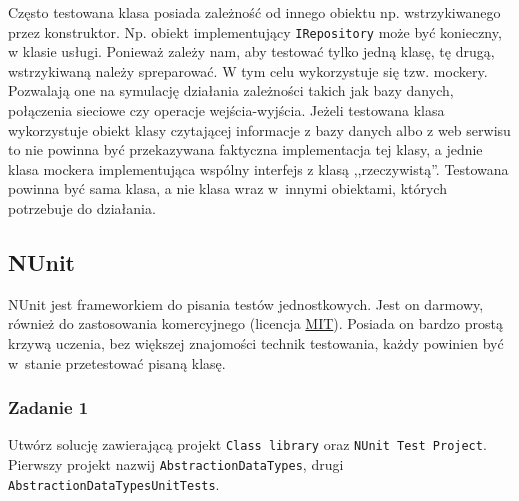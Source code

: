 
Często testowana klasa posiada zależność od innego obiektu np. wstrzykiwanego przez konstruktor. Np. obiekt implementujący \texttt{IRepository} może być konieczny, w klasie usługi. Ponieważ zależy nam, aby testować tylko jedną klasę, tę drugą, wstrzykiwaną należy spreparować. W tym celu wykorzystuje się tzw. mockery. Pozwalają one na symulację działania zależności takich jak bazy danych, połączenia sieciowe czy operacje wejścia-wyjścia. Jeżeli testowana klasa wykorzystuje obiekt klasy czytającej informacje z bazy danych albo z web serwisu to nie powinna być przekazywana faktyczna implementacja tej klasy, a jednie klasa mockera implementująca wspólny interfejs z klasą ,,rzeczywistą''. Testowana powinna być sama klasa, a nie klasa wraz w~innymi obiektami, których potrzebuje do działania. 


\subsection{NUnit}
NUnit jest frameworkiem do pisania testów jednostkowych. Jest on darmowy, również do zastosowania komercyjnego (licencja \href{https://mit-license.org/}{MIT}). Posiada on bardzo prostą krzywą uczenia, bez większej znajomości technik testowania, każdy powinien być w~stanie przetestować pisaną klasę.

\subsubsection{Zadanie 1}\label{lab5/sec/exercise_1}
Utwórz solucję zawierającą projekt \texttt{Class library} oraz \texttt{NUnit Test Project}. Pierwszy projekt nazwij \texttt{AbstractionDataTypes}, drugi \texttt{AbstractionDataTypesUnitTests}. 

